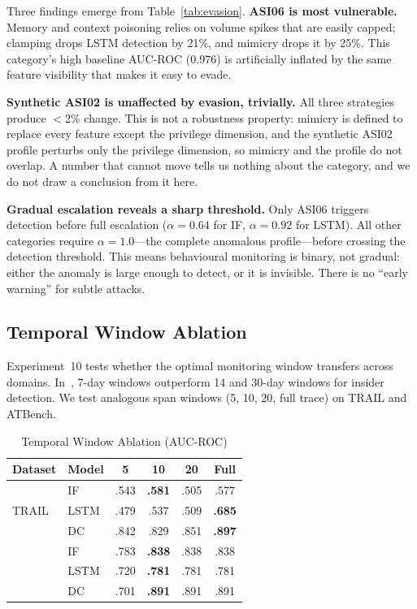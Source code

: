 \documentclass[conference]{IEEEtran}
\begin{document}
Three findings emerge from Table~\ref{tab:evasion}. \textbf{ASI06 is most vulnerable.} Memory and context poisoning relies on volume spikes that are easily capped; clamping drops LSTM detection by 21\%, and mimicry drops it by 25\%. This category's high baseline AUC-ROC (0.976) is artificially inflated by the same feature visibility that makes it easy to evade.

\textbf{Synthetic ASI02 is unaffected by evasion, trivially.} All three strategies produce $<$2\% change. This is not a robustness property: mimicry is defined to replace every feature except the privilege dimension, and the synthetic ASI02 profile perturbs only the privilege dimension, so mimicry and the profile do not overlap. A number that cannot move tells us nothing about the category, and we do not draw a conclusion from it here.

\textbf{Gradual escalation reveals a sharp threshold.} Only ASI06 triggers detection before full escalation ($\alpha = 0.64$ for IF, $\alpha = 0.92$ for LSTM). All other categories require $\alpha = 1.0$---the complete anomalous profile---before crossing the detection threshold. This means behavioural monitoring is binary, not gradual: either the anomaly is large enough to detect, or it is invisible. There is no ``early warning'' for subtle attacks.

\subsection{Temporal Window Ablation}
\label{sec:temporal}

Experiment~10 tests whether the optimal monitoring window transfers across domains. In~\cite{rimal2026insider}, 7-day windows outperform 14 and 30-day windows for insider detection. We test analogous span windows (5, 10, 20, full trace) on TRAIL and ATBench.

\begin{table}[htbp]
\caption{Temporal Window Ablation (AUC-ROC)}
\label{tab:temporal}
\centering
\small
\begin{tabular}{@{}llcccc@{}}
\toprule
\textbf{Dataset} & \textbf{Model} & \textbf{5} & \textbf{10} & \textbf{20} & \textbf{Full} \\
\midrule
\multirow{3}{*}{TRAIL}
 & IF   & .543 & \textbf{.581} & .505 & .577 \\
 & LSTM & .479 & .537 & .509 & \textbf{.685} \\
 & DC   & .842 & .829 & .851 & \textbf{.897} \\
\addlinespace
\multirow{3}{*}{ATBench}
 & IF   & .783 & \textbf{.838} & .838 & .838 \\
 & LSTM & .720 & \textbf{.781} & .781 & .781 \\
 & DC   & .701 & \textbf{.891} & .891 & .891 \\
\bottomrule
\end{tabular}
\end{table}
\end{document}
